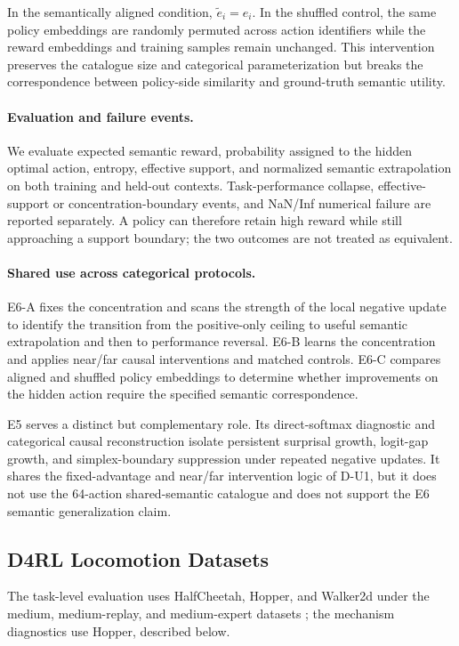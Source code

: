 \documentclass{article}
\theoremstyle{plain}
\theoremstyle{definition}
\theoremstyle{remark}
\begin{document}
In the semantically aligned condition,
$\widetilde e_i=e_i$.
In the shuffled control, the same policy embeddings are randomly
permuted across action identifiers while the reward embeddings and
training samples remain unchanged. This intervention preserves the
catalogue size and categorical parameterization but breaks the
correspondence between policy-side similarity and ground-truth semantic
utility.

\paragraph{Evaluation and failure events.}
We evaluate expected semantic reward, probability assigned to the hidden
optimal action, entropy, effective support, and normalized semantic
extrapolation on both training and held-out contexts. Task-performance
collapse, effective-support or concentration-boundary events, and
NaN/Inf numerical failure are reported separately. A policy can
therefore retain high reward while still approaching a support boundary;
the two outcomes are not treated as equivalent.

\paragraph{Shared use across categorical protocols.}
E6-A fixes the concentration and scans the strength of the local
negative update to identify the transition from the positive-only
ceiling to useful semantic extrapolation and then to performance
reversal. E6-B learns the concentration and applies near/far causal
interventions and matched controls. E6-C compares aligned and shuffled
policy embeddings to determine whether improvements on the hidden action
require the specified semantic correspondence.

E5 serves a distinct but complementary role. Its direct-softmax
diagnostic and categorical causal reconstruction isolate persistent
surprisal growth, logit-gap growth, and simplex-boundary suppression
under repeated negative updates. It shares the fixed-advantage and
near/far intervention logic of D-U1, but it does not use the 64-action
shared-semantic catalogue and does not support the E6 semantic
generalization claim.

\subsection{D4RL Locomotion Datasets}
\label{app:hopper_datasets}

The task-level evaluation uses HalfCheetah, Hopper, and Walker2d under
the medium, medium-replay, and medium-expert datasets
\citep{fu2020d4rl}; the mechanism diagnostics use Hopper, described
below.
\end{document}
